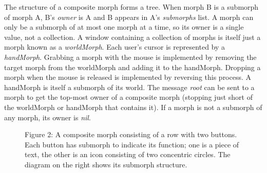 \documentclass[letterpaper,10pt,english]{sphinxmanual}
\begin{document}
The structure of a composite morph forms a tree. When morph B is a submorph of morph A, B's \emph{owner} is A and B appears in A's \emph{submorphs} list. A morph can only be a submorph of at most one morph at a time, so its owner is a single value, not a collection. A window containing a collection of morphs is itself just a morph known as a \emph{worldMorph}. Each user's cursor is represented by a \emph{handMorph}. Grabbing a morph with the mouse is implemented by removing the target morph from the worldMorph and adding it to the handMorph. Dropping a morph when the mouse is released is implemented by reversing this process. A handMorph is itself a submorph of its world. The message \emph{root} can be sent to a morph to get the top-most owner of a composite morph (stopping just short of the worldMorph or handMorph that contains it). If a morph is not a submorph of any morph, its owner is \emph{nil}.
\begin{figure}[htbp]\begin{flushleft}
\capstart

\caption{Figure 2: A composite morph consisting of a row with two buttons. Each button has submorph to indicate its function; one is a piece of text, the other is an icon consisting of two concentric circles. The diagram on the right shows its submorph structure.}\end{flushleft}\end{figure}
\end{document}
